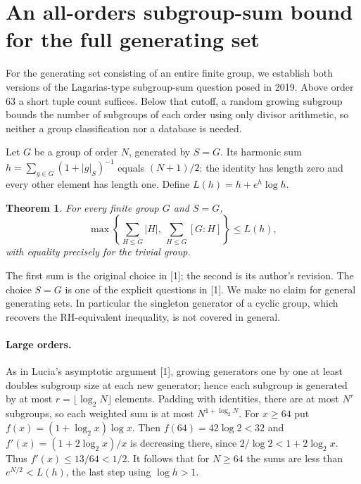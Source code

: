\documentclass[11pt,a4paper]{article}
\numberwithin{equation}{section}
\newtheorem{theorem}{Theorem}[section]
\theoremstyle{definition}
\theoremstyle{remark}
\newenvironment{sectionabstract}{\par\smallskip\begingroup\small\noindent}{\par\endgroup\medskip}
\begin{document}
\begingroup

\section{\texorpdfstring{An all-orders subgroup-sum bound for the full generating set}{An all-orders subgroup-sum bound for the full generating set}}\label{section:r50showa}
\par\medskip


\begin{sectionabstract}
For the generating set consisting of an entire finite group, we establish both versions of the Lagarias-type subgroup-sum question posed in 2019. Above order $63$ a short tuple count suffices. Below that cutoff, a random growing subgroup bounds the number of subgroups of each order using only divisor arithmetic, so neither a group classification nor a database is needed.
\end{sectionabstract}
Let $G$ be a group of order $N$, generated by $S=G$. Its harmonic sum $h=\sum_{g\in G}(1+|g|_S)^{-1}$ equals $(N+1)/2$: the identity has length zero and every other element has length one. Define $L(h)=h+e^h\log h$.
\begin{theorem}
For every finite group $G$ and $S=G$,
\[
 \max\left\{\sum_{H\le G}|H|,\ \sum_{H\le G}[G:H]\right\}\le L(h),
\]
with equality precisely for the trivial group.
\end{theorem}
The first sum is the original choice in [1]; the second is its author's revision. The choice $S=G$ is one of the explicit questions in [1]. We make no claim for general generating sets. In particular the singleton generator of a cyclic group, which recovers the RH-equivalent inequality, is not covered in general.

\paragraph{Large orders.}
As in Lucia's asymptotic argument [1], growing generators one by one at least doubles subgroup size at each new generator; hence each subgroup is generated by at most $r=\lfloor\log_2 N\rfloor$ elements. Padding with identities, there are at most $N^r$ subgroups, so each weighted sum is at most $N^{1+\log_2N}$. For $x\ge64$ put $f(x)=(1+\log_2 x)\log x$. Then $f(64)=42\log 2<32$ and $f'(x)=(1+2\log_2 x)/x$ is decreasing there, since $2/\log2 < 1+2\log_2 x$. Thus $f'(x)\le13/64<1/2$. It follows that for $N\ge64$ the sums are less than $e^{N/2}<L(h)$, the last step using $\log h>1$.
\end{document}
